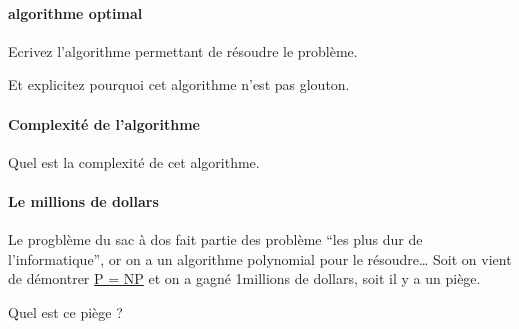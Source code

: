 \documentclass[
]{article}
\begin{document}
\hypertarget{algorithme-optimal}{%
\paragraph{algorithme optimal}\label{algorithme-optimal}}

Ecrivez l'algorithme permettant de résoudre le problème.

Et explicitez pourquoi cet algorithme n'est pas glouton.

\hypertarget{complexituxe9-de-lalgorithme}{%
\paragraph{Complexité de
l'algorithme}\label{complexituxe9-de-lalgorithme}}

Quel est la complexité de cet algorithme.

\hypertarget{le-millions-de-dollars}{%
\paragraph{Le millions de dollars}\label{le-millions-de-dollars}}

Le progblème du sac à dos fait partie des problème ``les plus dur de
l'informatique'', or on a un algorithme polynomial pour le
résoudre\ldots{} Soit on vient de démontrer
\href{https://fr.wikipedia.org/wiki/Probl\%C3\%A8mes_du_prix_du_mill\%C3\%A9naire\#Probl\%C3\%A8me_ouvert_P_=_NP}{P
= NP} et on a gagné 1millions de dollars, soit il y a un piège.

Quel est ce piège ?
\end{document}
